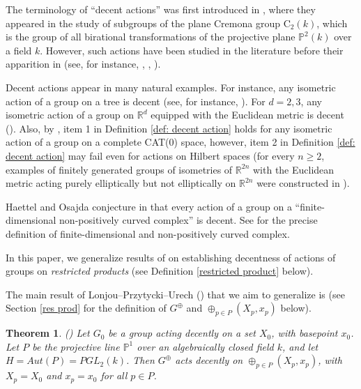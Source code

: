 \documentclass[12pt]{article}
\newtheorem{thm}{Theorem}[section]
\theoremstyle{definition}
\newcommand{\R}{\mathbb{R}}
\begin{document}
The terminology of ``decent actions'' was first introduced in \cite[Definition 1.2]{Algebraic}, where they appeared in the study of subgroups of the plane Cremona group $\mathrm{C}_2(k)$, which is the group of all birational transformations of the projective plane $\mathbb{P}^2(k)$ over a field $k$. However, such actions have been studied in the literature before their apparition in \cite{Algebraic} (see, for instance, \cite{Breuillard_Fujiwara}, \cite{Locallyelliptic},  \cite{NOP22}).  

Decent actions appear in many natural examples. For instance, any isometric action of a group on a tree is decent (see, for instance, \cite[Proposition 2.5]{Introduction_to_group_theory}). For $d =2, 3$, any isometric action of a group on $\R^d$ equipped with the Euclidean metric is decent (\cite[Proposition 9.2]{Breuillard_Fujiwara}). Also, by \cite[Chapter II.2, Corollary 2.8(1)]{BH99}, item 1 in Definition \ref{def: decent action} holds for any isometric action of a group on a complete CAT(0) space, however, item 2 in Definition \ref{def: decent action} may fail even for actions on Hilbert spaces (for every $n \geq 2$, examples of finitely generated groups of isometries of $\R^{2n}$ with the Euclidean metric acting purely elliptically but not elliptically on $\R^{2n}$ were constructed in \cite[Example 9.1]{Breuillard_Fujiwara}). 

Haettel and Osajda conjecture in \cite{Locallyelliptic} that every action of a group on a ``finite-dimensional non-positively curved complex'' is decent. See \cite[Definition 2.1]{Locallyelliptic} for the precise definition of finite-dimensional and non-positively curved complex. 

In this paper, we generalize results of \cite{Algebraic} on establishing decentness of actions of groups on \emph{restricted products} (see Definition \ref{restricted product} below). 

The main result of Lonjou--Przytycki--Urech (\cite{Algebraic}) that we aim to generalize is \cite[Theorem 1.10]{Algebraic} (see Section \ref{res prod} for the definition of $G^{\oplus}$ and $\oplus_{p \in P} (X_p, x_p)$ below). 

\begin{thm}(\cite[Theorem 1.10]{Algebraic})
    \label{thm: Algebraic main theorem}
    Let $G_0$ be a group acting decently on a set $X_0$, with basepoint $x_0$. Let $P$ be the projective line $\mathbb{P}^1$ over an algebraically closed field $k$, and let $H = Aut(P) = PGL_2(k)$. Then $G^{\oplus}$ acts decently on $\oplus_{p \in P} (X_p, x_p)$, with $X_p = X_0$ and $x_p = x_0$ for all $p \in P$.  
\end{thm}
\end{document}
